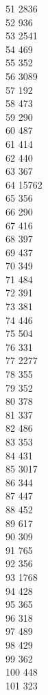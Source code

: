 { 51	2836 \\
 52	936 \\
 53	2541 \\
 54	469 \\
 55	352 \\
 56	3089 \\
 57	192 \\
 58	473 \\
 59	290 \\
 60	487 \\
 61	414 \\
 62	440 \\
 63	367 \\
 64	15762 \\
 65	356 \\
 66	290 \\
 67	416 \\
 68	397 \\
 69	437 \\
 70	349 \\
 71	484 \\
 72	391 \\
 73	381 \\
 74	446 \\
 75	504 \\
 76	331 \\
 77	2277 \\
 78	355 \\
 79	352 \\
 80	378 \\
 81	337 \\
 82	486 \\
 83	353 \\
 84	431 \\
 85	3017 \\
 86	344 \\
 87	447 \\
 88	452 \\
 89	617 \\
 90	309 \\
 91	765 \\
 92	356 \\
 93	1768 \\
 94	428 \\
 95	365 \\
 96	318 \\
 97	489 \\
 98	429 \\
 99	362 \\
 100	448 \\
 101	323 \\
}
